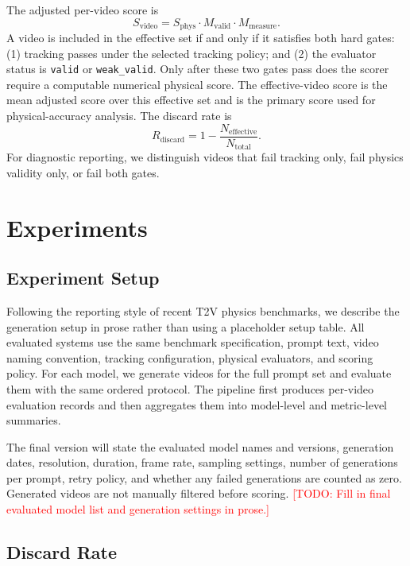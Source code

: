 \documentclass{article}
\newcommand{\todo}[1]{\textcolor{red}{[TODO: #1]}}
\begin{document}
The adjusted per-video score is
\begin{equation}
    S_{\mathrm{video}} =
    S_{\mathrm{phys}} \cdot M_{\mathrm{valid}} \cdot M_{\mathrm{measure}}.
\end{equation}
A video is included in the effective set if and only if it satisfies both hard gates: (1) tracking passes under the selected tracking policy; and (2) the evaluator status is \texttt{valid} or \texttt{weak\_valid}.
Only after these two gates pass does the scorer require a computable numerical physical score.
The effective-video score is the mean adjusted score over this effective set and is the primary score used for physical-accuracy analysis.
The discard rate is
\begin{equation}
    R_{\mathrm{discard}} = 1 - \frac{N_{\mathrm{effective}}}{N_{\mathrm{total}}}.
\end{equation}
For diagnostic reporting, we distinguish videos that fail tracking only, fail physics validity only, or fail both gates.

\section{Experiments}

\subsection{Experiment Setup}

Following the reporting style of recent T2V physics benchmarks, we describe the generation setup in prose rather than using a placeholder setup table.
All evaluated systems use the same benchmark specification, prompt text, video naming convention, tracking configuration, physical evaluators, and scoring policy.
For each model, we generate videos for the full prompt set and evaluate them with the same ordered protocol.
The pipeline first produces per-video evaluation records and then aggregates them into model-level and metric-level summaries.

The final version will state the evaluated model names and versions, generation dates, resolution, duration, frame rate, sampling settings, number of generations per prompt, retry policy, and whether any failed generations are counted as zero.
Generated videos are not manually filtered before scoring.
\todo{Fill in final evaluated model list and generation settings in prose.}

\subsection{Discard Rate}
\end{document}
